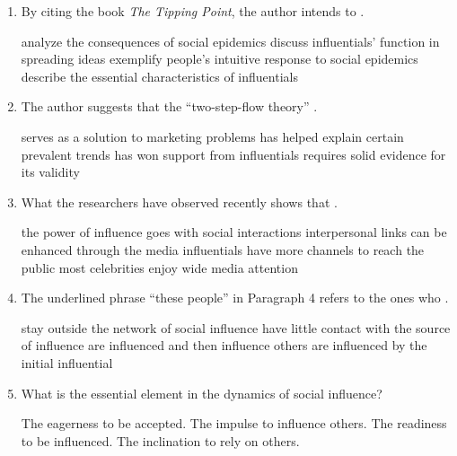 \begin{enumerate}[resume]
	\item
By citing the book \emph{The Tipping Point}, the author
	intends to \lineread.


\fourchoices
{analyze the consequences of social epidemics}
{discuss influentials' function in spreading ideas}
{exemplify people's intuitive response to social epidemics}
{describe the essential characteristics of influentials}



\item
 The author suggests that the ``two-step-flow theory'' \lineread.


\fourchoices
{serves as a solution to marketing problems}
{has helped explain certain prevalent trends}
{has won support from influentials}
{requires solid evidence for its validity}


\item 
What the researchers have observed recently shows that \lineread.



\fourchoices
{the power of influence goes with social interactions}
{interpersonal links can be enhanced through the media}
{influentials have more channels to reach the public}
{most celebrities enjoy wide media attention}



\item
The underlined phrase ``these people'' in Paragraph 4 refers
to the ones who \lineread.


\fourchoices
{stay outside the network of social influence}
{have little contact with the source of influence}
{are influenced and then influence others}
{are influenced by the initial influential}


\item
 What is the essential element in the dynamics of social
influence?


\fourchoices
{The eagerness to be accepted.}
{The impulse to influence others.}
{The readiness to be influenced.}
{The inclination to rely on others.}

\end{enumerate}



